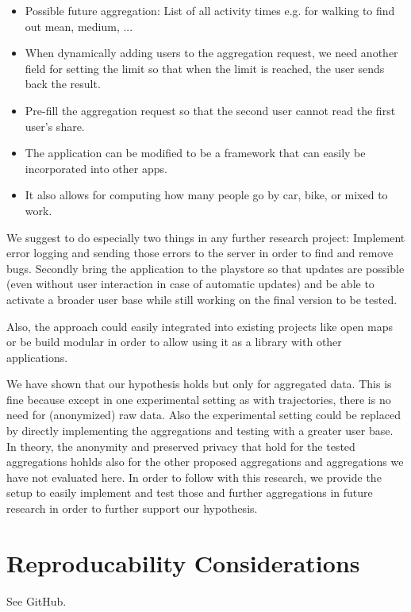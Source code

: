\begin{itemize}
	\item Possible future aggregation: List of all activity times e.g. for walking to find out mean, medium, ...
	\item When dynamically adding users to the aggregation request, we need another field for setting the limit so that when the limit is reached, the user sends back the result.
	\item Pre-fill the aggregation request so that the second user cannot read the first user's share.
	\item The application can be modified to be a framework that can easily be incorporated into other apps.
	\item It also allows for computing how many people go by car, bike, or mixed to work.

\end{itemize}
We suggest to do especially two things in any further research project: Implement error logging and sending those errors to the server in order to find and remove bugs. Secondly bring the application to the playstore so that updates are possible (even without user interaction in case of automatic updates) and be able to activate a broader user base while still working on the final version to be tested.

Also, the approach could easily integrated into existing projects like open maps or be build modular in order to allow using it as a library with other applications.

We have shown that our hypothesis holds but only for aggregated data. This is fine because except in one experimental setting as with trajectories, there is no need for (anonymized) raw data. Also the experimental setting could be replaced by directly implementing the aggregations and testing with a greater user base. In theory, the anonymity and preserved privacy that hold for the tested aggregations hohlds also for the other proposed aggregations and aggregations we have not evaluated here. In order to follow with this research, we provide the setup to easily implement and test those and further aggregations in future research in order to further support our hypothesis.

\section{Reproducability Considerations}
See GitHub.